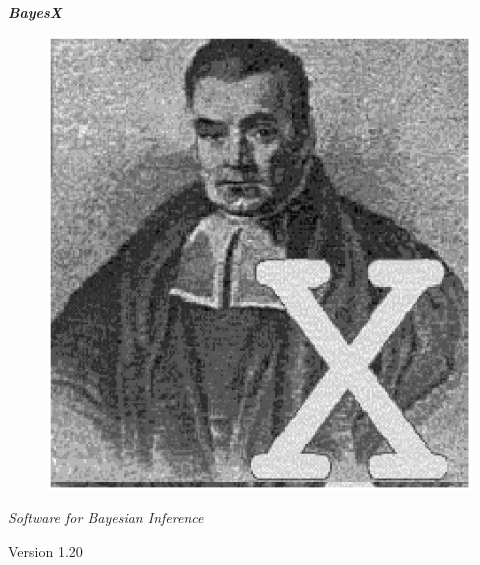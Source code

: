 \vspace{7cm}

\thispagestyle{empty}

\begin{center}
{\bf \em \huge Bayes{\Huge X}} \\

\vspace{0.5cm}

\begin{figure}[h]
\begin{center}
\includegraphics[scale=1.2]{grafiken/bayesicon.eps}
\end{center}
\end{figure}


{\em Software for Bayesian Inference}


\vspace{1cm}

Version 1.20 \\

\vspace{0.7cm}
\end{center}

